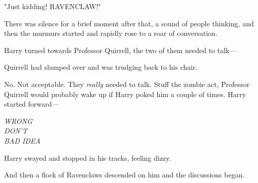 "Just kidding! RAVENCLAW!"

There was silence for a brief moment after that, a sound of people thinking, 
and then the murmurs started and rapidly rose to a roar of conversation.

Harry turned towards Professor Quirrell, the two of them needed to talk---

Quirrell had slumped over and was trudging back to his chair.

No. Not acceptable. They \emph{really} needed to talk. Stuff the zombie act, 
Professor Quirrell would probably wake up if Harry poked him a couple of times. 
Harry started forward---

\emph{WRONG\\
DON'T\\
BAD IDEA}

Harry swayed and stopped in his tracks, feeling dizzy.

And then a flock of Ravenclaws descended on him and the discussions began.
